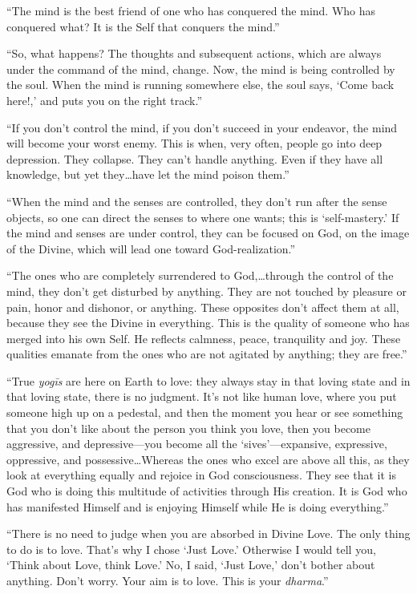 \enquote{The mind is the best friend of one who has conquered the mind. Who has conquered what? It is the Self that conquers the mind.}

\enquote{So, what happens? The thoughts and subsequent actions, which are always under the command of the mind, change. Now, the mind is being controlled by the soul. When the mind is running somewhere else, the soul says, \enquote{Come back here!,} and puts you on the right track.}

\enquote{If you don’t control the mind, if you don’t succeed in your endeavor, the mind will become your worst enemy. This is when, very often, people go into deep depression. They collapse. They can’t handle anything. Even if they have all knowledge, but yet they\ldots have let the mind poison them.}

\enquote{When the mind and the senses are controlled, they don’t run after the sense objects, so one can direct the senses to where one wants; this is \enquote{self-mastery.} If the mind and senses are under control, they can be focused on God, on the image of the Divine, which will lead one toward God-realization.}

\enquote{The ones who are completely surrendered to God,\ldots through the control of the mind, they don’t get disturbed by anything. They are not touched by pleasure or pain, honor and dishonor, or anything. These opposites don’t affect them at all, because they see the Divine in everything. This is the quality of someone who has merged into his own Self. He reflects calmness, peace, tranquility and joy. These qualities emanate from the ones who are not agitated by anything; they are free.}

\enquote{True \textit{yogīs} are here on Earth to love: they always stay in that loving state and in that loving state, there is no judgment. It’s not like human love, where you put someone high up on a pedestal, and then the moment you hear or see something that you don’t like about the person you think you love, then you become aggressive, and depressive---you become all the \enquote{sives}---expansive, expressive, oppressive, and possessive\ldots Whereas the ones who excel are above all this, as they look at everything equally and rejoice in God consciousness. They see that it is God who is doing this multitude of activities through His creation. It is God who has manifested Himself and is enjoying Himself while He is doing everything.}

\enquote{There is no need to judge when you are absorbed in Divine Love. The only thing to do is to love. That’s why I chose \enquote{Just Love.} Otherwise I would tell you, \enquote{Think about Love, think Love.} No, I said, \enquote{Just Love,} don’t bother about anything. Don’t worry. Your aim is to love. This is your \textit{dharma}.}

